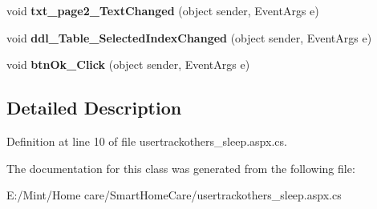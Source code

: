 \begin{DoxyCompactItemize}
\item 
\hypertarget{classusertrackothers__sleep_aebf6473f837f24e2a0fc6f7ef5ea0fa4}{void {\bfseries txt\-\_\-page2\-\_\-\-Text\-Changed} (object sender, Event\-Args e)}\label{classusertrackothers__sleep_aebf6473f837f24e2a0fc6f7ef5ea0fa4}

\item 
\hypertarget{classusertrackothers__sleep_a2359bed68d4e9f853f630bc3e33b56f5}{void {\bfseries ddl\-\_\-\-Table\-\_\-\-Selected\-Index\-Changed} (object sender, Event\-Args e)}\label{classusertrackothers__sleep_a2359bed68d4e9f853f630bc3e33b56f5}

\item 
\hypertarget{classusertrackothers__sleep_aa206ec8ed095e55ef0cd7116839e9cca}{void {\bfseries btn\-Ok\-\_\-\-Click} (object sender, Event\-Args e)}\label{classusertrackothers__sleep_aa206ec8ed095e55ef0cd7116839e9cca}

\end{DoxyCompactItemize}


\subsection{Detailed Description}


Definition at line 10 of file usertrackothers\-\_\-sleep.\-aspx.\-cs.



The documentation for this class was generated from the following file\-:\begin{DoxyCompactItemize}
\item 
E\-:/\-Mint/\-Home care/\-Smart\-Home\-Care/usertrackothers\-\_\-sleep.\-aspx.\-cs\end{DoxyCompactItemize}

